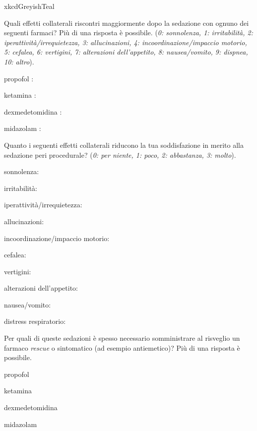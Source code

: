\begin{survey}{xkcdGreyishTeal}
       \newpage
       
       \Query Quali effetti collaterali riscontri maggiormente dopo la sedazione con ognuno dei seguenti farmaci? Più di una risposta è possibile. (\emph{0: sonnolenza, 1: irritabilità, 2: iperattività/irrequietezza, 3: allucinazioni, 4: incoordinazione/impaccio motorio, 5: cefalea, 6: vertigini, 7: alterazioni dell’appetito, 8: nausea/vomito, 9: dispnea, 10: altro}). 
    
           propofol : \hfill {} 
           
           ketamina : \hfill {} 
           
           dexmedetomidina : \hfill {} 
           
           midazolam : \hfill {} 
    
       \Query Quanto i seguenti effetti collaterali riducono la tua soddisfazione in merito alla sedazione peri procedurale? (\emph{0: per niente, 1: poco, 2: abbastanza, 3: molto}).
       
           sonnolenza: \hfill {} 
           
           
           irritabilità:  \hfill {}
           
           iperattività/irrequietezza: \hfill {}
           
           allucinazioni: \hfill {}
           
           incoordinazione/impaccio motorio: \hfill {}
           
           cefalea: \hfill {}
           
           vertigini: \hfill {}
           
           alterazioni dell’appetito: \hfill {}
           
           nausea/vomito: \hfill {}
           
           distress respiratorio: \hfill {}
    
       \Query Per quali di queste sedazioni è spesso necessario somministrare al risveglio un farmaco \emph{rescue} o sintomatico (ad esempio antiemetico)? Più di una risposta è possibile.
       \begin{Qlist}
           \item propofol 
           \item ketamina 
           \item dexmedetomidina 
           \item midazolam 
       \end{Qlist}
       

\end{survey}
